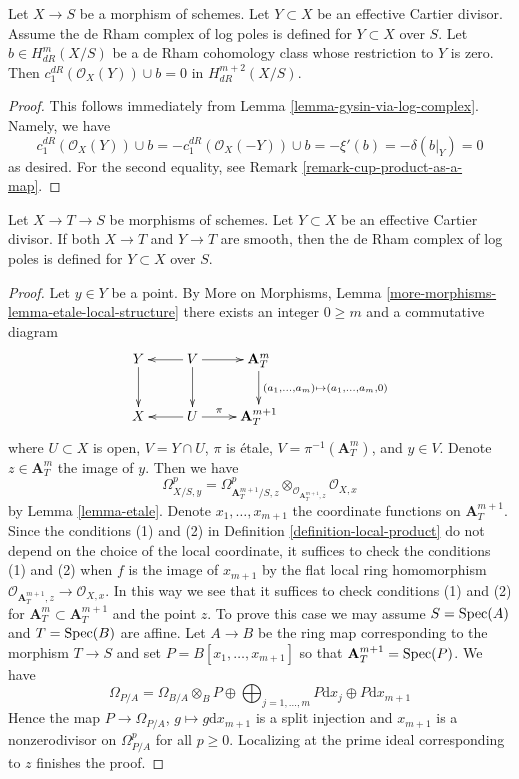 \begin{lemma}
\label{lemma-log-complex-consequence}
Let $X \to S$ be a morphism of schemes. Let $Y \subset X$ be an effective
Cartier divisor. Assume the de Rham complex of log poles is defined for
$Y \subset X$ over $S$. Let $b \in H^m_{dR}(X/S)$ be a de Rham cohomology
class whose restriction to $Y$ is zero. Then
$c_1^{dR}(\mathcal{O}_X(Y)) \cup b = 0$ in $H^{m + 2}_{dR}(X/S)$.
\end{lemma}

\begin{proof}
This follows immediately from Lemma \ref{lemma-gysin-via-log-complex}.
Namely, we have
$$
c_1^{dR}(\mathcal{O}_X(Y)) \cup b =
-c_1^{dR}(\mathcal{O}_X(-Y)) \cup b = -\xi'(b) = -\delta(b|_Y) = 0
$$
as desired. For the second equality, see
Remark \ref{remark-cup-product-as-a-map}.
\end{proof}

\begin{lemma}
\label{lemma-check-log-smooth}
Let $X \to T \to S$ be morphisms of schemes. Let $Y \subset X$ be an effective
Cartier divisor. If both $X \to T$ and $Y \to T$ are smooth, then
the de Rham complex of log poles is defined for $Y \subset X$ over $S$.
\end{lemma}

\begin{proof}
Let $y \in Y$ be a point.
By More on Morphisms, Lemma \ref{more-morphisms-lemma-etale-local-structure}
there exists an integer $0 \geq m$ and a commutative diagram
$$
\xymatrix{
Y \ar[d] &
V \ar[l] \ar[d] \ar[r] &
\mathbf{A}^m_T
\ar[d]^{(a_1, \ldots, a_m) \mapsto (a_1, \ldots, a_m, 0)} \\
X &
U \ar[l] \ar[r]^-\pi &
\mathbf{A}^{m + 1}_T
}
$$
where $U \subset X$ is open, $V = Y \cap U$,
$\pi$ is \'etale, $V = \pi^{-1}(\mathbf{A}^m_T)$, and $y \in V$.
Denote $z \in \mathbf{A}^m_T$ the image of $y$. Then we have
$$
\Omega^p_{X/S, y} = \Omega^p_{\mathbf{A}^{m + 1}_T/S, z}
\otimes_{\mathcal{O}_{\mathbf{A}^{m + 1}_T, z}} \mathcal{O}_{X, x}
$$
by Lemma \ref{lemma-etale}. Denote $x_1, \ldots, x_{m + 1}$
the coordinate functions on $\mathbf{A}^{m + 1}_T$.
Since the conditions (1) and (2) in Definition \ref{definition-local-product}
do not depend on the choice of the local coordinate,
it suffices to check the conditions (1) and (2) when $f$ is the
image of $x_{m + 1}$ by the flat local ring homomorphism
$\mathcal{O}_{\mathbf{A}^{m + 1}_T, z} \to \mathcal{O}_{X, x}$.
In this way we see that it suffices to check conditions (1) and (2)
for $\mathbf{A}^m_T \subset \mathbf{A}^{m + 1}_T$ and the point $z$.
To prove this case we may assume $S = \mathop{\mathrm{Spec}}(A)$ and $T = \mathop{\mathrm{Spec}}(B)$
are affine. Let $A \to B$ be the ring map corresponding to the morphism
$T \to S$ and set $P = B[x_1, \ldots, x_{m + 1}]$ so that
$\mathbf{A}^{m + 1}_T = \mathop{\mathrm{Spec}}(P)$. We have
$$
\Omega_{P/A} = \Omega_{B/A} \otimes_B P \oplus
\bigoplus\nolimits_{j = 1, \ldots, m} P \text{d}x_j \oplus
P \text{d}x_{m + 1}
$$
Hence the map $P \to \Omega_{P/A}$, $g \mapsto g \text{d}x_{m + 1}$
is a split injection and $x_{m + 1}$ is a nonzerodivisor on
$\Omega^p_{P/A}$ for all $p \geq 0$. Localizing at the prime ideal
corresponding to $z$ finishes the proof.
\end{proof}

